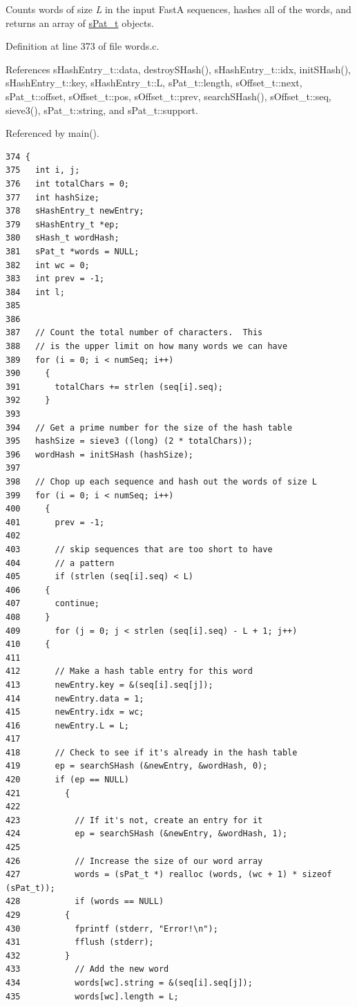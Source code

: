 Counts words of size {\em L\/} in the input Fast\-A sequences, hashes all of the words, and returns an array of \hyperlink{structsPat__t}{s\-Pat\_\-t} objects.

Definition at line 373 of file words.c.

References s\-Hash\-Entry\_\-t::data, destroy\-SHash(), s\-Hash\-Entry\_\-t::idx, init\-SHash(), s\-Hash\-Entry\_\-t::key, s\-Hash\-Entry\_\-t::L, s\-Pat\_\-t::length, s\-Offset\_\-t::next, s\-Pat\_\-t::offset, s\-Offset\_\-t::pos, s\-Offset\_\-t::prev, search\-SHash(), s\-Offset\_\-t::seq, sieve3(), s\-Pat\_\-t::string, and s\-Pat\_\-t::support.

Referenced by main().

\scriptsize\begin{verbatim}374 {
375   int i, j;
376   int totalChars = 0;
377   int hashSize;
378   sHashEntry_t newEntry;
379   sHashEntry_t *ep;
380   sHash_t wordHash;
381   sPat_t *words = NULL;
382   int wc = 0;
383   int prev = -1;
384   int l;
385 
386 
387   // Count the total number of characters.  This
388   // is the upper limit on how many words we can have
389   for (i = 0; i < numSeq; i++)
390     {
391       totalChars += strlen (seq[i].seq);
392     }
393 
394   // Get a prime number for the size of the hash table
395   hashSize = sieve3 ((long) (2 * totalChars));
396   wordHash = initSHash (hashSize);
397 
398   // Chop up each sequence and hash out the words of size L
399   for (i = 0; i < numSeq; i++)
400     {
401       prev = -1;
402 
403       // skip sequences that are too short to have
404       // a pattern
405       if (strlen (seq[i].seq) < L)
406     {
407       continue;
408     }
409       for (j = 0; j < strlen (seq[i].seq) - L + 1; j++)
410     {
411 
412       // Make a hash table entry for this word
413       newEntry.key = &(seq[i].seq[j]);
414       newEntry.data = 1;
415       newEntry.idx = wc;
416       newEntry.L = L;
417 
418       // Check to see if it's already in the hash table
419       ep = searchSHash (&newEntry, &wordHash, 0);
420       if (ep == NULL)
421         {
422 
423           // If it's not, create an entry for it
424           ep = searchSHash (&newEntry, &wordHash, 1);
425 
426           // Increase the size of our word array
427           words = (sPat_t *) realloc (words, (wc + 1) * sizeof (sPat_t));
428           if (words == NULL)
429         {
430           fprintf (stderr, "Error!\n");
431           fflush (stderr);
432         }
433           // Add the new word
434           words[wc].string = &(seq[i].seq[j]);
435           words[wc].length = L;

\end{verbatim}
